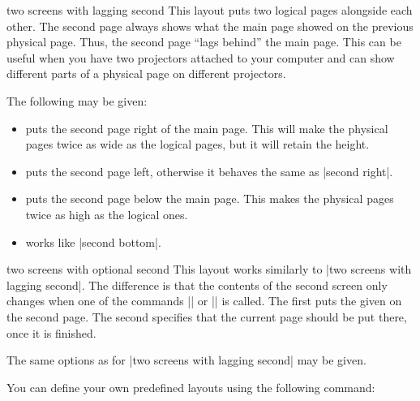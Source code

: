 \begin{pgflayout}{two screens with lagging second}
    This layout puts two logical pages alongside each other. The second page
    always shows what the main page showed on the previous physical page. Thus,
    the second page ``lags behind'' the main page. This can be useful when you
    have two projectors attached to your computer and can show different parts
    of a physical page on different projectors.

    The following  may be given:
    \begin{itemize}
        \item {} puts the second page right of the main
            page. This will make the physical pages twice as wide as the
            logical pages, but it will retain the height.
        \item {} puts the second page left, otherwise it
            behaves the same as |second right|.
        \item {} puts the second page below the main
            page. This makes the physical pages twice as high as the logical
            ones.
        \item {} works like |second bottom|.
    \end{itemize}
\end{pgflayout}

\begin{pgflayout}{two screens with optional second}
    This layout works similarly to |two screens with lagging second|. The
    difference is that the contents of the second screen only changes when one
    of the commands || or
    || is called. The first puts the given
     on the second page. The second specifies that the current page
    should be put there, once it is finished.

    The same options as for |two screens with lagging second| may be given.
\end{pgflayout}

You can define your own predefined layouts using the following command:


